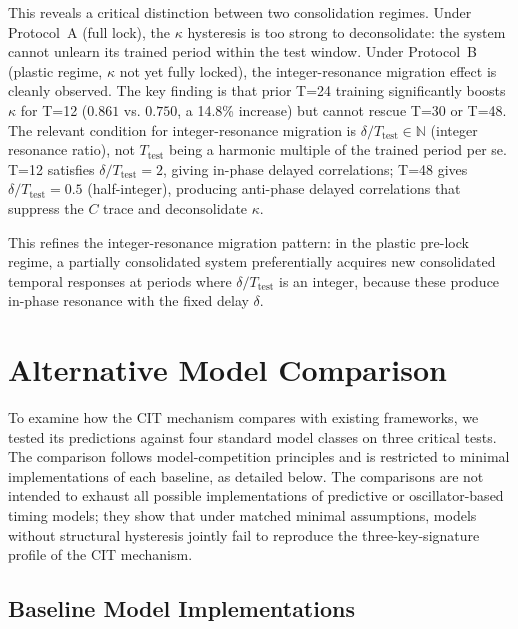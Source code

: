 \documentclass[12pt,a4paper]{article}
\begin{document}
This reveals a critical distinction between two consolidation regimes. Under Protocol~A (full lock), the $\kappa$ hysteresis is too strong to deconsolidate: the system cannot unlearn its trained period within the test window. Under Protocol~B (plastic regime, $\kappa$ not yet fully locked), the integer-resonance migration effect is cleanly observed. The key finding is that prior T=24 training significantly boosts $\kappa$ for T=12 ($0.861$ vs. $0.750$, a 14.8\% increase) but cannot rescue T=30 or T=48. The relevant condition for integer-resonance migration is $\delta/T_{\mathrm{test}} \in \mathbb{N}$ (integer resonance ratio), not $T_{\mathrm{test}}$ being a harmonic multiple of the trained period per se. T=12 satisfies $\delta/T_{\mathrm{test}} = 2$, giving in-phase delayed correlations; T=48 gives $\delta/T_{\mathrm{test}} = 0.5$ (half-integer), producing anti-phase delayed correlations that suppress the $C$ trace and deconsolidate $\kappa$.



This refines the integer-resonance migration pattern: in the plastic pre-lock regime, a partially consolidated system preferentially acquires new consolidated temporal responses at periods where $\delta/T_{\mathrm{test}}$ is an integer, because these produce in-phase resonance with the fixed delay $\delta$.



\section{Alternative Model Comparison}
\label{sec:comparison}




To examine how the CIT mechanism compares with existing frameworks, we tested its predictions against four standard model classes on three critical tests. The comparison follows model-competition principles \cite{burnham2002model} and is restricted to minimal implementations of each baseline, as detailed below. The comparisons are not intended to exhaust all possible implementations of predictive or oscillator-based timing models; they show that under matched minimal assumptions, models without structural hysteresis jointly fail to reproduce the three-key-signature profile of the CIT mechanism.



\subsection{Baseline Model Implementations}
\end{document}
